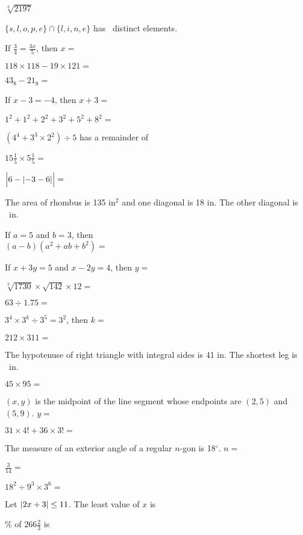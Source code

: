 \documentclass{numbersense}
\begin{document}
\begin{questions}
    \q $\sqrt[3]{2197}$ \ans

    \q $\{s, l, o, p, e\} \cap \{l, i, n, e\}$ has \ans~distinct elements.

    \q If $\frac{3}{4} = \frac{3x}{5}$, then $x = $ \ans

    \aq $118 \times 118 - 19 \times 121 = $\ans

    \q $43_8 - 21_8 =$\ans

    \q If $x - 3 = -4$, then $x+3 = $\ans

    \q $1^2 + 1^2 + 2^2 + 3^2 + 5^2 + 8^2 = $ \ans

    \q $(4^4 + 3^3 \times 2^2 ) \div 5$ has a remainder of \ans

    \columnbreak

    \q $15\frac{1}{5} \times 5\frac{1}{5} = $ \ans



    \q $\abs[\Big]{6 - \abs{-3 - 6}} = $ \ans

    \q The area of rhombus is 135 in$^2$ and one diagonal is 18 in.  The other
    diagonal is \ans~in.

    \q If $a = 5$ and $b = 3$, then\\ $(a-b)(a^2 +ab +b^2) = $\ans

    \q If $x + 3y = 5$ and $x - 2y = 4$, then $y = $ \ans

    \aq $\sqrt[3]{1730} \times \sqrt{142} \times 12 = $\ans

    \q $63 \div 1.75 = $\ans

    \q $3^4 \times 3^k \div 3^5 = 3^2$, then $k = $\ans

    \q $212 \times 311 = $\ans

    \q The hypotenuse of right triangle with integral sides is 41 in. The
    shortest leg is \ans~in.

    \q $45 \times 95 = $\ans

    \q $(x, y)$ is the midpoint of the line segment whose endpoints are $(2, 5)$
    and $(5, 9)$. $y =$ \ans

    \q $31 \times 4! + 36 \times 3! = $ \ans

    \q The measure of an exterior angle of a regular $n$-gon is 18$^\circ$.
    $n=$\ans

    \q $\frac{3}{14} =$ \ans

    \aq $18^2 \div 9^3 \times 3^6 = $\ans

    \q Let $\abs{2x + 3} \leq 11$. The least value of $x$ is \ans

    \% of $266\frac{2}{3}$ is \ans


\end{questions}
\end{document}

